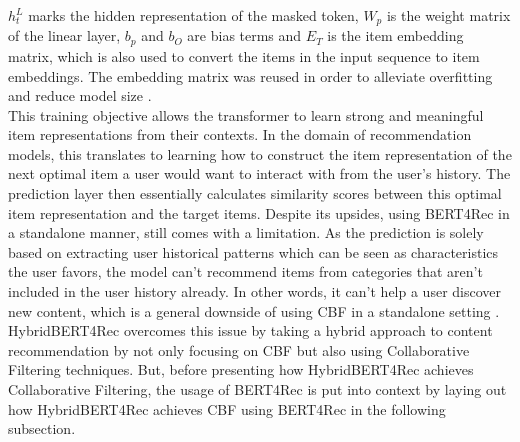 \documentclass{Academic}
\begin{document}
        $h_t^L$ marks the hidden representation of the masked token, $W_p$ is the weight matrix of the linear layer, $b_p$ and $b_O$ are bias terms and $E_T$ is the item embedding matrix, which is also used to convert the items in the input sequence to item embeddings. The embedding matrix was reused in order to alleviate overfitting and reduce model size \cite{sunBERT4RecSequentialRecommendation2019}. \\
        This training objective allows the transformer to learn strong and meaningful item representations from their contexts. In the domain of recommendation models, this translates to learning how to construct the item representation of the next optimal item a user would want to interact with from the user's history. The prediction layer then essentially calculates similarity scores between this optimal item representation and the target items. Despite its upsides, using BERT4Rec in a standalone manner, still comes with a limitation. As the prediction is solely based on extracting user historical patterns which can be seen as characteristics the user favors, the model can't recommend items from categories that aren't included in the user history already. In other words, it can't help a user discover new content, which is a general downside of using CBF in a standalone setting \cite{channarongHybridBERT4RecHybridContentBased2022}. HybridBERT4Rec overcomes this issue by taking a hybrid approach to content recommendation by not only focusing on CBF but also using Collaborative Filtering techniques. But, before presenting how HybridBERT4Rec achieves Collaborative Filtering, the usage of BERT4Rec is put into context by laying out how HybridBERT4Rec achieves CBF using BERT4Rec in the following subsection.
\end{document}
